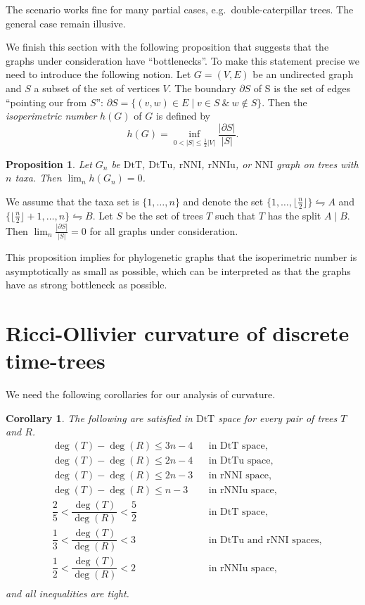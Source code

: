 \documentclass{amsart}
\newtheorem{proposition}[lemma]{Proposition}
\newtheorem{corollary}[lemma]{Corollary}
\theoremstyle{definition}
\newcommand{\nni}{\mathrm{NNI}}
\newcommand{\rnni}{\mathrm{rNNI}}
\newcommand{\rnniu}{\mathrm{rNNIu}}
\newcommand{\mdts}{\mathrm{DtT}}
\newcommand{\mdtsu}{\mathrm{DtTu}}
\begin{document}
The scenario works fine for many partial cases, e.g.\ double-caterpillar trees.
The general case remain illusive.
\endproof

We finish this section with the following proposition that suggests that the graphs under consideration have ``bottlenecks''.
To make this statement precise we need to introduce the following notion.
Let $G = (V, E)$ be an undirected graph and $S$ a subset of the set of vertices $V$.
The boundary $\partial S$ of S is the set of edges ``pointing our from $S$'': $\partial S = \{(v,w) \in E \mid v \in S ~\&~ w \notin S\}$.
Then the {\em isoperimetric number} $h(G)$ of $G$ is defined by
\[
h(G) = \inf\limits_{0 < |S| \leq \frac12|V|} \frac{|\partial S|}{|S|}.
\]

\begin{proposition}\label{isoperiPropo}
Let $G_n$ be $\mdts$, $\mdtsu$, $\rnni$, $\rnniu$, or $\nni$ graph on trees with $n$ taxa.
Then $\lim_n h(G_n) = 0$.
\end{proposition}

\proof
We assume that the taxa set is $\{1,\ldots,n\}$ and denote the set $\{1,\ldots,\lfloor \frac n2 \rfloor\} \leftrightharpoons A$ and $\{\lfloor \frac n2 \rfloor + 1,\ldots, n\} \leftrightharpoons B$.
Let $S$ be the set of trees $T$ such that $T$ has the split $A \mid B$.
Then $\lim_n \frac{|\partial S|}{|S|} = 0$ for all graphs under consideration.
\endproof

This proposition implies for phylogenetic graphs that the isoperimetric number is asymptotically as small as possible, which can be interpreted as that the graphs have as strong bottleneck as possible.


\section{Ricci-Ollivier curvature of discrete time-trees}

We need the following corollaries for our analysis of curvature.

\begin{corollary}\label{degreeBounds}
The following are satisfied in $\mdts$ space for every pair of trees $T$ and $R$.
\begin{align*}
& \deg(T)-\deg(R) \leq 3n-4		&& \mbox{in $\mdts$ space,}\\
& \deg(T)-\deg(R) \leq 2n-4		&& \mbox{in $\mdtsu$ space,}\\
& \deg(T)-\deg(R) \leq 2n-3		&& \mbox{in $\rnni$ space,}\\
& \deg(T)-\deg(R) \leq n-3			&& \mbox{in $\rnniu$ space,}\\
& \dfrac25 < \dfrac{\deg(T)}{\deg(R)} < \dfrac52		&& \mbox{in $\mdts$ space,}\\
& \dfrac13 < \dfrac{\deg(T)}{\deg(R)} < 3			&& \mbox{in $\mdtsu$ and $\rnni$ spaces,}\\
& \dfrac12 < \dfrac{\deg(T)}{\deg(R)} < 2			&& \mbox{in $\rnniu$ space,}\\
\end{align*}
and all inequalities are tight.
\end{corollary}
\end{document}
